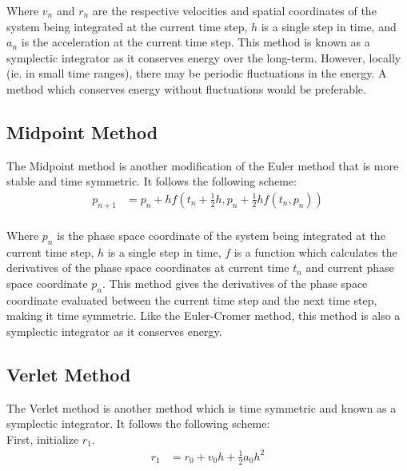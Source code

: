 \documentclass[10pt,letterpaper]{article}
\begin{document}
Where $v_n$ and $r_n$ are the respective velocities and spatial coordinates of the system being integrated at the current time step, $h$ is a single step in time, and $a_n$ is the acceleration at the current time step. This method is known as a symplectic integrator as it conserves energy over the long-term. However, locally (ie. in small time ranges), there may be periodic fluctuations in the energy. A method which conserves energy without fluctuations would be preferable.\\

\subsection{Midpoint Method}
The Midpoint method is another modification of the Euler method that is more stable and time symmetric. It follows the following scheme:\\

\begin{equation}
\begin{split}
p_{n+1} & = p_n + h f(t_n + \frac{1}{2}h, p_n + \frac{1}{2} h f(t_n, p_n))\\
\end{split}
\end{equation}\label{eqn:midpoint_method}

Where $p_n$ is the phase space coordinate of the system being integrated at the current time step, $h$ is a single step in time, $f$ is a function which calculates the derivatives of the phase space coordinates at current time $t_n$ and current phase space coordinate $p_n$. This method gives the derivatives of the phase space coordinate evaluated between the current time step and the next time step, making it time symmetric. Like the Euler-Cromer method, this method is also a symplectic integrator as it conserves energy.\\

\subsection{Verlet Method}
The Verlet method is another method which is time symmetric and known as a symplectic integrator. It follows the following scheme:\\

First, initialize $r_1$.\\

\begin{equation}
\begin{split}
r_{1} & = r_0 + v_0 h + \frac{1}{2} a_0 h^2\\
\end{split}
\end{equation}\label{eqn:verlet_method_init}
\end{document}
